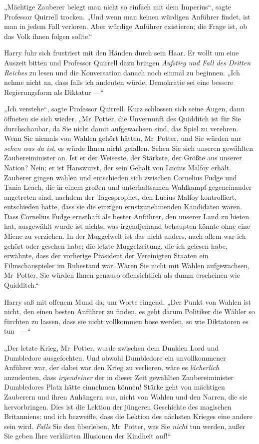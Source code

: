 {„Mächtige Zauberer belegt man nicht so einfach mit dem Imperius“, sagte Professor Quirrell trocken. „Und wenn man keinen würdigen Anführer findet, ist man in jedem Fall verloren. Aber würdige Anführer existieren; die Frage ist, ob das Volk ihnen folgen sollte.“

Harry fuhr sich frustriert mit den Händen durch sein Haar. Er wollt um eine Auszeit bitten und Professor Quirrell dazu bringen \emph{Aufstieg und Fall des Dritten Reiches} zu lesen und die Konversation danach noch einmal zu beginnen. „Ich nehme nicht an, dass falls ich andeuten würde, Demokratie sei eine bessere Regierungsform als Diktatur —“

„Ich verstehe“, sagte Professor Quirrell. Kurz schlossen sich seine Augen, dann öffneten sie sich wieder. „Mr~Potter, die Unvernunft des Quidditch ist für Sie durchschaubar, da Sie nicht damit aufgewachsen sind, das Spiel zu verehren. Wenn Sie niemals von Wahlen gehört hätten, Mr~Potter, und Sie würden nur \emph{sehen was da ist}, es würde Ihnen nicht gefallen. Sehen Sie sich unseren gewählten Zaubereiminister an. Ist er der Weiseste, der Stärkste, der Größte aus unserer Nation? Nein; er ist Hanswurst, der sein Gehalt von Lucius Malfoy erhält. Zauberer gingen wählen und entschieden sich zwischen Cornelius Fudge und Tania Leach, die in einem großen und unterhaltsamen Wahlkampf gegeneinander angetreten sind, nachdem der Tagesprophet, den Lucius Malfoy kontrolliert, entschieden hatte, dass sie die einzigen ernstzunehmenden Kandidaten waren. Dass Cornelius Fudge ernsthaft als bester Anführer, den unserer Land zu bieten hat, ausgewählt wurde ist nichts, was irgendjemand behaupten könnte ohne eine Miene zu verziehen. In der Muggelwelt ist das nicht anders, nach allem war ich gehört oder gesehen habe; die letzte Muggelzeitung, die ich gelesen habe, erwähnte, dass der vorherige Präsident der Vereinigten Staaten ein Filmschauspieler im Ruhestand war. Wären Sie nicht mit Wahlen aufgewachsen, Mr~Potter, Sie würden Ihnen genauso offensichtlich als dumm erscheinen wie Quidditch.“

Harry saß mit offenem Mund da, um Worte ringend. „Der Punkt von Wahlen ist nicht, den einen besten Anführer zu finden, es geht darum Politiker die Wähler so fürchten zu lassen, dass sie nicht vollkommen böse werden, so wie Diktatoren es tun ~—“

„Der letzte Krieg, Mr~Potter, wurde zwischen dem Dunklen Lord und Dumbledore ausgefochten. Und obwohl Dumbledore ein unvollkommener Anführer war, der dabei war den Krieg zu verlieren, wäre es \emph{lächerlich} anzudeuten, dass \emph{irgendeiner} der in dieser Zeit gewählten Zaubereiminister Dumbledores Platz hätte einnehmen können! Stärke geht von mächtigen Zauberern und ihren Anhängern aus, nicht von Wahlen und den Narren, die sie hervorbringen. Dies ist die Lektion der jüngeren Geschichte des magischen Britanniens; und ich bezweifle, dass die Lektion des nächsten Krieges eine andere sein wird. \emph{Falls} Sie den überleben, Mr~Potter, was Sie \emph{nicht} tun werden, außer Sie geben Ihre verklärten Illusionen der Kindheit auf!“

}
